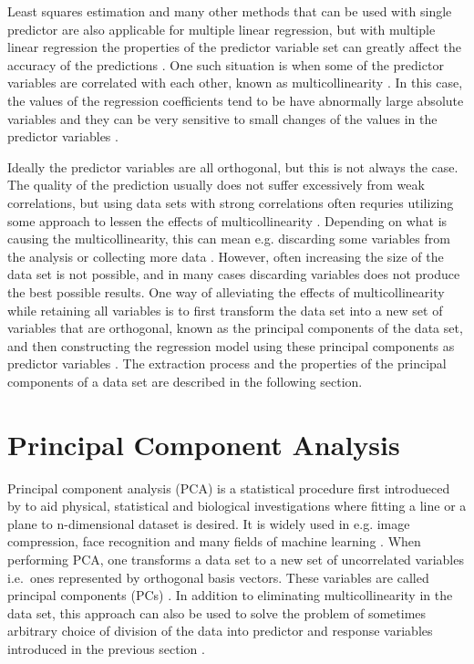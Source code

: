 \documentclass[english, twoside]{HYgradu}
\begin{document}
Least squares estimation and many other methods that can be used with single predictor are also applicable for multiple linear regression, but with multiple linear regression the properties of the predictor variable set can greatly affect the accuracy of the predictions \citep{montgomery2012introduction}. One such situation is when some of the predictor variables are correlated with each other, known as multicollinearity \citep{montgomery2012introduction}. In this case, the values of the regression coefficients tend to be have abnormally large absolute variables and they can be very sensitive to small changes of the values in the predictor variables \citep{montgomery2012introduction}.

Ideally the predictor variables are all orthogonal, but this is not always the case. 
The quality of the prediction usually does not suffer excessively from weak correlations, but using data sets with strong correlations often requries utilizing some approach to lessen the effects of multicollinearity \citep{montgomery2012introduction}. Depending on what is causing the multicollinearity, this can mean e.g. discarding some variables from the analysis or collecting more data \citep{montgomery2012introduction}. However, often increasing the size of the data set is not possible, and in many cases discarding variables does not produce the best possible results. One way of alleviating the effects of multicollinearity while retaining all variables is to first transform the data set into a new set of variables that are orthogonal, known as the principal components of the data set, and then constructing the regression model using these principal components as predictor variables \citep{montgomery2012introduction}. The extraction process and the properties of the principal components of a data set are described in the following section.


\section{Principal Component Analysis} \label{sect:pca}
Principal component analysis (PCA) is a statistical procedure first introdueced by \citet{pearson1901lines} to aid physical, statistical and biological investigations where fitting a line or a plane to n-dimensional dataset is desired. It is widely used in e.g. image compression, face recognition and many fields of machine learning \citep{smith2002tutorial, alpaydin2014introduction}. When performing PCA, one transforms a data set to a new set of uncorrelated variables i.e.\ ones represented by orthogonal basis vectors. These variables are called principal components (PCs) \citep{jolliffe2002principal}. In addition to eliminating multicollinearity in the data set, this approach can also be used to solve the problem of sometimes arbitrary choice of division of the data into predictor and response variables introduced in the previous section \citep{pearson1901lines}. 
\end{document}
